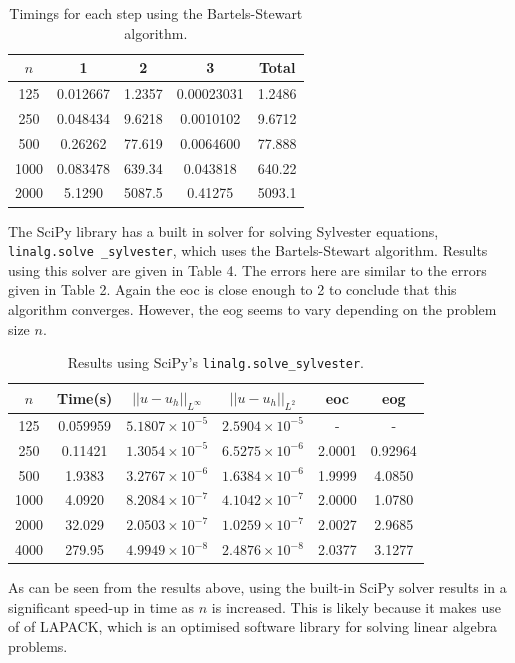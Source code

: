 \documentclass{article}
\numberwithin{equation}{section}
\begin{document}
\begin{table}[H]
\centering
\begin{tabular}{|c|c|c|c|c|}
\hline
$n$ & 1 & 2 & 3 & Total \\
\hline
125 & 0.012667 & 1.2357 & 0.00023031 & 1.2486 \\
250 & 0.048434 & 9.6218 & 0.0010102 & 9.6712 \\
500 & 0.26262 & 77.619 & 0.0064600 & 77.888 \\ 
1000 & 0.083478 & 639.34 & 0.043818 & 640.22 \\
2000 & 5.1290 & 5087.5 & 0.41275 & 5093.1 \\
\hline
\end{tabular}
\caption{Timings for each step using the Bartels-Stewart algorithm.}
\end{table}

The SciPy library has a built in solver for solving Sylvester equations, \texttt{linalg.solve \_sylvester}, which uses the Bartels-Stewart algorithm. Results using this solver are given in Table 4. The errors here are similar to the errors given in Table 2. Again the eoc is close enough to 2 to conclude that this algorithm converges. However, the eog seems to vary depending on the problem size $n$. 

\begin{table}[H]
\centering
\begin{tabular}{|c|c|c|c|c|c|}
\hline
$n$ & Time(s) & $|| u - u_h ||_{L^{\infty}}$ &$|| u - u_h ||_{L^{2}}$ & eoc & eog \\
\hline
125 & 0.059959 & $5.1807 \times 10^{-5}$ & $2.5904 \times 10^{-5}$ & - & - \\
250 & 0.11421 & $1.3054 \times 10^{-5}$ & $6.5275 \times 10^{-6}$ & 2.0001 & 0.92964 \\
500 & 1.9383 & $3.2767 \times 10^{-6}$ & $1.6384 \times 10^{-6}$ & 1.9999 & 4.0850  \\
1000 & 4.0920 & $8.2084 \times 10^{-7}$ & $4.1042 \times 10^{-7}$ & 2.0000 & 1.0780 \\
2000 & 32.029 & $2.0503 \times 10^{-7}$ & $1.0259 \times 10^{-7}$ & 2.0027 & 2.9685  \\
4000 & 279.95 & $4.9949 \times 10^{-8}$ & $2.4876 \times 10^{-8}$ & 2.0377 & 3.1277  \\
\hline
\end{tabular}
\caption{Results using SciPy's \texttt{linalg.solve\_sylvester}.}
\end{table}

As can be seen from the results above, using the built-in SciPy solver results in a significant speed-up in time as $n$ is increased. This is likely because it makes use of of LAPACK, which is an optimised software library for solving linear algebra problems.
\end{document}
